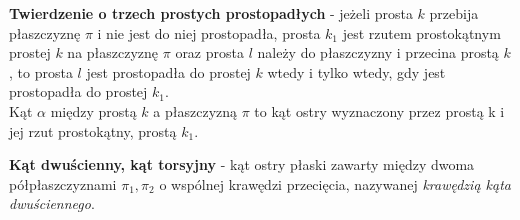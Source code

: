 \documentclass[14pt,a4paper]{extarticle}
\begin{document}
\hfill\break
\noindent \textbf{Twierdzenie o trzech prostych prostopadłych} - jeżeli prosta $k$ przebija płaszczyznę
$\pi$ i nie jest do niej prostopadła, prosta $k_{1}$ jest rzutem prostokątnym prostej $k$ na płaszczyznę
$\pi$ oraz prosta $l$ należy do płaszczyzny i przecina prostą $k$, to prosta $l$ jest prostopadła do
prostej $k$ wtedy i tylko wtedy, gdy jest prostopadła do prostej $k_{1}$.\\
Kąt $\alpha$ między prostą $k$ a płaszczyzną $\pi$ to kąt ostry wyznaczony przez prostą k i jej
rzut prostokątny, prostą $k_{1}$.

\hfill\break
\noindent \textbf{Kąt dwuścienny, kąt torsyjny} - kąt ostry płaski zawarty między dwoma półpłaszczyznami
$\pi_{1}, \pi_{2}$ o wspólnej krawędzi przecięcia, nazywanej \textit{krawędzią kąta dwuściennego}. 
\MoveBelowBox\unskip\hfill\break
\end{document}
